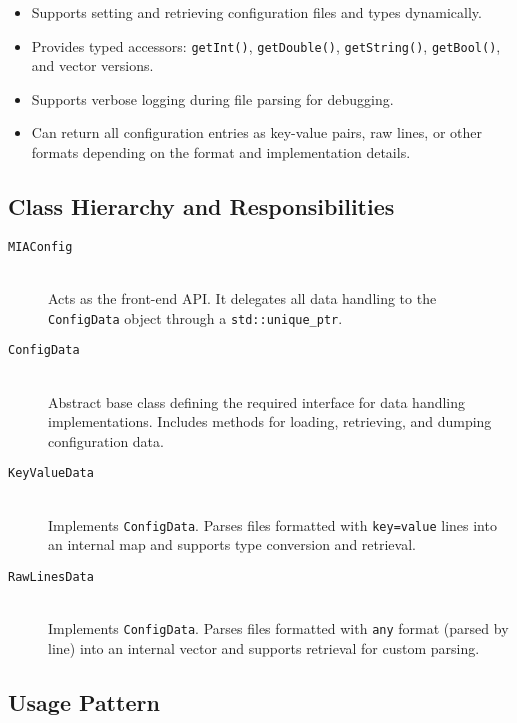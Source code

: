 \begin{itemize}
	\item Supports setting and retrieving configuration files and types dynamically.
	\item Provides typed accessors: \texttt{getInt()}, \texttt{getDouble()}, \texttt{getString()}, \texttt{getBool()}, and vector versions.
	\item Supports verbose logging during file parsing for debugging.
	\item Can return all configuration entries as key-value pairs, raw lines, or other formats depending on the format and implementation details.
\end{itemize}

\subsection{Class Hierarchy and Responsibilities}

\begin{description}
	\item[\texttt{MIAConfig}] 
	\hfill \\
	Acts as the front-end API. It delegates all data handling to the \texttt{ConfigData} object through a \texttt{std::unique\_ptr}.
	
	\item[\texttt{ConfigData}] 
	\hfill \\
	Abstract base class defining the required interface for data handling implementations. Includes methods for loading, retrieving, and dumping configuration data.
	
	\item[\texttt{KeyValueData}]
	\hfill \\
	Implements \texttt{ConfigData}. Parses files formatted with \texttt{key=value} lines into an internal map and supports type conversion and retrieval.
	
	\item[\texttt{RawLinesData}]
	\hfill \\
	Implements \texttt{ConfigData}. Parses files formatted with \texttt{any} format (parsed by line) into an internal vector and supports retrieval for custom parsing.
\end{description}

\subsection{Usage Pattern}

